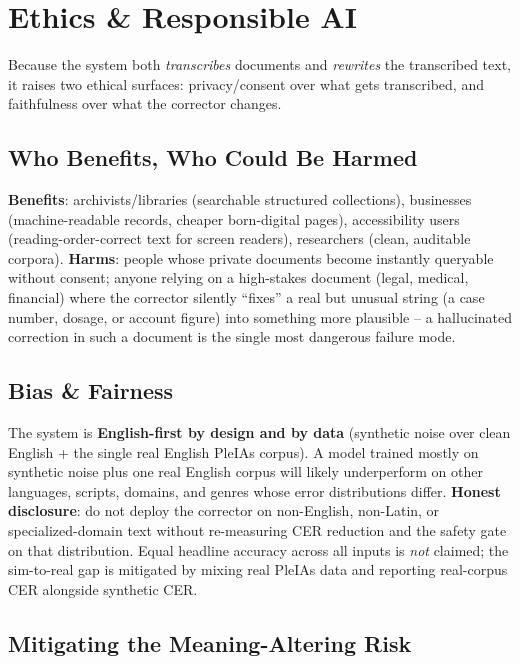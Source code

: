 \documentclass[12pt,a4paper]{article}
\begin{document}
\section{Ethics \& Responsible AI}

Because the system both \emph{transcribes} documents and \emph{rewrites} the transcribed text, it raises two ethical surfaces: privacy/consent over what gets transcribed, and faithfulness over what the corrector changes.

\subsection{Who Benefits, Who Could Be Harmed}

\textbf{Benefits}: archivists/libraries (searchable structured collections), businesses (machine-readable records, cheaper born-digital pages), accessibility users (reading-order-correct text for screen readers), researchers (clean, auditable corpora). \textbf{Harms}: people whose private documents become instantly queryable without consent; anyone relying on a high-stakes document (legal, medical, financial) where the corrector silently ``fixes'' a real but unusual string (a case number, dosage, or account figure) into something more plausible -- a hallucinated correction in such a document is the single most dangerous failure mode.

\subsection{Bias \& Fairness}

The system is \textbf{English-first by design and by data} (synthetic noise over clean English + the single real English PleIAs corpus). A model trained mostly on synthetic noise plus one real English corpus will likely underperform on other languages, scripts, domains, and genres whose error distributions differ. \textbf{Honest disclosure}: do not deploy the corrector on non-English, non-Latin, or specialized-domain text without re-measuring CER reduction and the safety gate on that distribution. Equal headline accuracy across all inputs is \emph{not} claimed; the sim-to-real gap is mitigated by mixing real PleIAs data and reporting real-corpus CER alongside synthetic CER.

\subsection{Mitigating the Meaning-Altering Risk}
\end{document}
